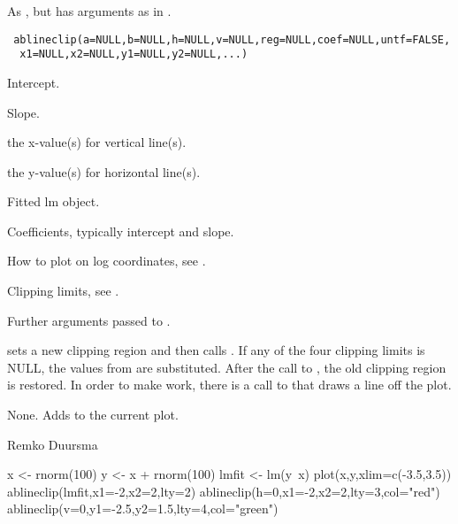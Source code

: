 \begin{Description}\relax
As , but has arguments  as in .
\end{Description}
\begin{Usage}
\begin{verbatim}
 ablineclip(a=NULL,b=NULL,h=NULL,v=NULL,reg=NULL,coef=NULL,untf=FALSE,
  x1=NULL,x2=NULL,y1=NULL,y2=NULL,...)
\end{verbatim}
\end{Usage}
\begin{Arguments}
\begin{ldescription}
\item[\code{a}] Intercept.
\item[\code{b}] Slope.
\item[\code{h}] the x-value(s) for vertical line(s).
\item[\code{v}] the y-value(s) for horizontal line(s).
\item[\code{reg}] Fitted lm object. 
\item[\code{coef}] Coefficients, typically intercept and slope.
\item[\code{untf}] How to plot on log coordinates, see .
\item[\code{x1,x2,y1,y2}] Clipping limits, see .
\item[\code{...}] Further arguments passed to .
\end{ldescription}
\end{Arguments}
\begin{Details}\relax
{} sets a new clipping region and then calls .
If any of the four clipping limits is NULL, the values from 
are substituted. After the call to , the old clipping region
is restored. In order to make  work, there is a call to 
that draws a line off the plot.
\end{Details}
\begin{Value}
None. Adds to the current plot.
\end{Value}
\begin{Author}\relax
Remko Duursma
\end{Author}
\begin{SeeAlso}\relax
{}
\end{SeeAlso}
\begin{Examples}
\begin{ExampleCode}
 x <- rnorm(100)
 y <- x + rnorm(100)
 lmfit <- lm(y~x)
 plot(x,y,xlim=c(-3.5,3.5))
 ablineclip(lmfit,x1=-2,x2=2,lty=2)
 ablineclip(h=0,x1=-2,x2=2,lty=3,col="red")
 ablineclip(v=0,y1=-2.5,y2=1.5,lty=4,col="green")
\end{ExampleCode}
\end{Examples}

